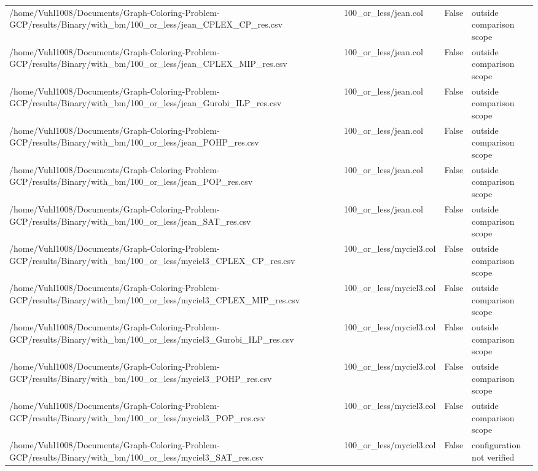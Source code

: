 \begin{table}[htbp]
\begin{tabular}{llll}
/home/Vuhl1008/Documents/Graph-Coloring-Problem-GCP/results/Binary/with\_bm/100\_or\_less/jean\_CPLEX\_CP\_res.csv & 100\_or\_less/jean.col & False & outside comparison scope \\
/home/Vuhl1008/Documents/Graph-Coloring-Problem-GCP/results/Binary/with\_bm/100\_or\_less/jean\_CPLEX\_MIP\_res.csv & 100\_or\_less/jean.col & False & outside comparison scope \\
/home/Vuhl1008/Documents/Graph-Coloring-Problem-GCP/results/Binary/with\_bm/100\_or\_less/jean\_Gurobi\_ILP\_res.csv & 100\_or\_less/jean.col & False & outside comparison scope \\
/home/Vuhl1008/Documents/Graph-Coloring-Problem-GCP/results/Binary/with\_bm/100\_or\_less/jean\_POHP\_res.csv & 100\_or\_less/jean.col & False & outside comparison scope \\
/home/Vuhl1008/Documents/Graph-Coloring-Problem-GCP/results/Binary/with\_bm/100\_or\_less/jean\_POP\_res.csv & 100\_or\_less/jean.col & False & outside comparison scope \\
/home/Vuhl1008/Documents/Graph-Coloring-Problem-GCP/results/Binary/with\_bm/100\_or\_less/jean\_SAT\_res.csv & 100\_or\_less/jean.col & False & outside comparison scope \\
/home/Vuhl1008/Documents/Graph-Coloring-Problem-GCP/results/Binary/with\_bm/100\_or\_less/myciel3\_CPLEX\_CP\_res.csv & 100\_or\_less/myciel3.col & False & outside comparison scope \\
/home/Vuhl1008/Documents/Graph-Coloring-Problem-GCP/results/Binary/with\_bm/100\_or\_less/myciel3\_CPLEX\_MIP\_res.csv & 100\_or\_less/myciel3.col & False & outside comparison scope \\
/home/Vuhl1008/Documents/Graph-Coloring-Problem-GCP/results/Binary/with\_bm/100\_or\_less/myciel3\_Gurobi\_ILP\_res.csv & 100\_or\_less/myciel3.col & False & outside comparison scope \\
/home/Vuhl1008/Documents/Graph-Coloring-Problem-GCP/results/Binary/with\_bm/100\_or\_less/myciel3\_POHP\_res.csv & 100\_or\_less/myciel3.col & False & outside comparison scope \\
/home/Vuhl1008/Documents/Graph-Coloring-Problem-GCP/results/Binary/with\_bm/100\_or\_less/myciel3\_POP\_res.csv & 100\_or\_less/myciel3.col & False & outside comparison scope \\
/home/Vuhl1008/Documents/Graph-Coloring-Problem-GCP/results/Binary/with\_bm/100\_or\_less/myciel3\_SAT\_res.csv & 100\_or\_less/myciel3.col & False & configuration not verified \\

\end{tabular}
\end{table}
